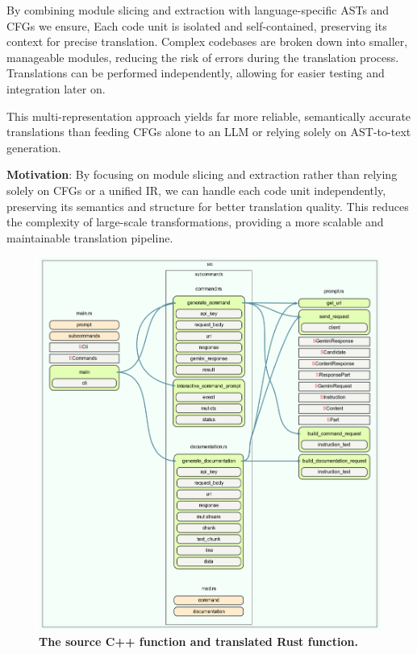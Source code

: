 \documentclass[twocolumn]{article}
\begin{document}
By combining module slicing and extraction with language-specific ASTs and CFGs we ensure, 
Each code unit is isolated and self-contained, preserving its context for precise translation. 
Complex codebases are broken down into smaller, manageable modules, reducing the risk of errors during the translation process. 
Translations can be performed independently, allowing for easier testing and integration later on. 

This multi-representation approach yields far more reliable, semantically accurate translations than feeding CFGs alone to an LLM or relying solely on AST-to-text generation.  

\textbf{Motivation}: By focusing on module slicing and extraction rather than relying solely on CFGs or a unified IR, we can handle each code unit independently, preserving its semantics and structure for better translation quality. This reduces the complexity of large-scale transformations, providing a more scalable and maintainable translation pipeline.

\begin{figure}[t]
        \centering
        \includegraphics[width=\textwidth]{figures/cfg.png}
        \caption{\textbf{The source C++ function and translated Rust function.}}
        \label{fig:translate-overview1}
\end{figure}
\end{document}

